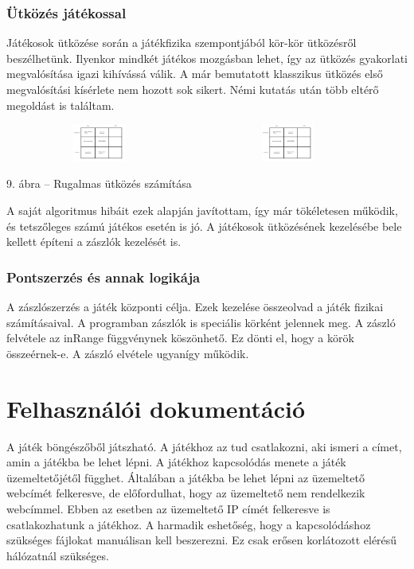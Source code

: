 \documentclass[]{article}
\begin{document}
\hypertarget{uxfctkuxf6zuxe9s-juxe1tuxe9kossal}{%
\subsubsection{Ütközés
játékossal}\label{uxfctkuxf6zuxe9s-juxe1tuxe9kossal}}

Játékosok ütközése során a játékfizika szempontjából kör-kör ütközésről
beszélhetünk. Ilyenkor mindkét játékos mozgásban lehet, így az ütközés
gyakorlati megvalósítása igazi kihívássá válik. A már bemutatott
klasszikus ütközés első megvalósítási kísérlete nem hozott sok sikert.
Némi kutatás után több eltérő megoldást is találtam.

\includegraphics[width=2.42083in,height=0.48611in]{media/image5.png}
\includegraphics[width=2.42083in,height=0.48611in]{media/image6.png}

9. ábra -- Rugalmas ütközés számítása

A saját algoritmus hibáit ezek alapján javítottam, így már tökéletesen
működik, és tetszőleges számú játékos esetén is jó. A játékosok
ütközésének kezelésébe bele kellett építeni a zászlók kezelését is.

\hypertarget{pontszerzuxe9s-uxe9s-annak-logikuxe1ja}{%
\subsubsection{Pontszerzés és annak
logikája}\label{pontszerzuxe9s-uxe9s-annak-logikuxe1ja}}

A zászlószerzés a játék központi célja. Ezek kezelése összeolvad a játék
fizikai számításaival. A programban zászlók is speciális körként
jelennek meg. A zászló felvétele az inRange függvénynek köszönhető. Ez
dönti el, hogy a körök összeérnek-e. A zászló elvétele ugyanígy működik.

\hypertarget{felhasznuxe1luxf3i-dokumentuxe1ciuxf3}{%
\section{Felhasználói
dokumentáció}\label{felhasznuxe1luxf3i-dokumentuxe1ciuxf3}}

A játék böngészőből játszható. A játékhoz az tud csatlakozni, aki ismeri
a címet, amin a játékba be lehet lépni. A játékhoz kapcsolódás menete a
játék üzemeltetőjétől függhet. Általában a játékba be lehet lépni az
üzemeltető webcímét felkeresve, de előfordulhat, hogy az üzemeltető nem
rendelkezik webcímmel. Ebben az esetben az üzemeltető IP címét
felkeresve is csatlakozhatunk a játékhoz. A harmadik eshetőség, hogy a
kapcsolódáshoz szükséges fájlokat manuálisan kell beszerezni. Ez csak
erősen korlátozott elérésű hálózatnál szükséges.
\end{document}
